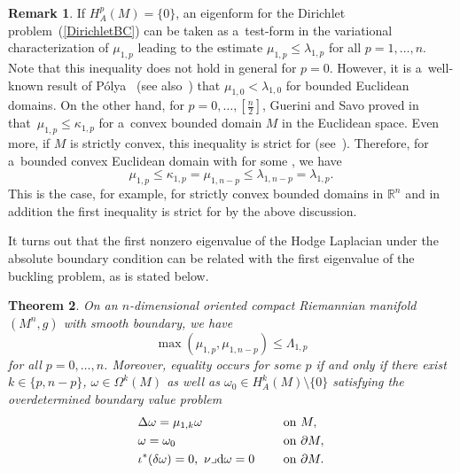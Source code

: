 \documentclass[pdftex]{sigma}
\numberwithin{equation}{section}
\newtheorem{Theorem}{Theorem}[section]
\theoremstyle{definition}
\newtheorem{Remark}[Theorem]{Remark}
\begin{document}
\begin{Remark}\label{RemarkPolya}
If $H_A^p(M)=\{0\}$, an eigenform for the Dirichlet problem~(\ref{DirichletBC}) can be taken as a~test-form in the variational characterization of $\mu_{1,p}$ leading to the estimate $\mu_{1,p}\leq\lambda_{1,p}$ for all $p=1,\dots,n$.
Note that this inequality does not hold in general for $p=0$.
However, it is a~well-known result of P\'olya~\cite{Polya1952} (see also~\cite{Friedlander91}) that $\mu_{1,0}<\lambda_{1,0}$ for bounded Euclidean domains.
On the other hand, for $p=0,\dots,[\frac{n}{2}]$, Guerini and Savo proved in~\cite[Theorem 2.6\,(b))]{GueriniSavo2004} that~${\mu_{1,p}\leq\kappa_{1,p}}$ for a~convex bounded domain $M$ in the Euclidean space.
Even more, if $M$ is strictly convex, this inequality is strict for  (see~\cite[Theorem 2.6\,(c))]{GueriniSavo2004}).
Therefore, for a~bounded convex Euclidean domain with  for some , we have
\[
\mu_{1,p}\leq \kappa_{1,p}=\mu_{1,n-p}\leq\lambda_{1,n-p}=\lambda_{1,p}.
\]
This is the case, for example, for strictly convex bounded domains in $\mathbb{R}^n$ and in addition the first inequality is strict for  by the above discussion.
\end{Remark}

It turns out that the first nonzero eigenvalue of the Hodge Laplacian under the absolute boundary condition can be related with the first eigenvalue of the buckling problem, as is stated below.

\begin{Theorem}\label{BuckAbs}
On an $n$-dimensional oriented compact Riemannian manifold $(M^n,g)$ with smooth boundary, we have
\begin{equation}\label{BuckAbs1}
\max(\mu_{1,p},\mu_{1,n-p})\leq\Lambda_{1,p}
\end{equation}
for all $p=0,\dots,n$. Moreover, equality occurs for some $p$ if and only if there exist $k\in\{p,n-p\}$, $\omega\in\Omega^k(M)$ as well as $\omega_0\in H_A^k(M)\setminus\{0\}$ satisfying the overdetermined boundary value problem%
\begin{equation}\label{ODP}
\begin{aligned}
&\Delta \omega =\mu_{1,k} \omega \ \quad&&\textrm{on } M, \\
&\omega = \omega_0 \ \quad&& \textrm{on }\partial M,\\
&\iota^*(\delta\omega) =0,\ \nu\lrcorner {\rm d}\omega =0 \ \quad&& \textrm{on }\partial M.
\end{aligned}
\end{equation}
\end{Theorem}
\end{document}
